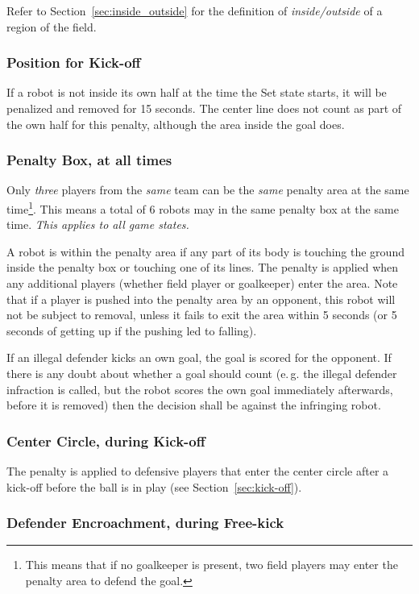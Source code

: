 \documentclass[12pt]{article}
\newcommand{\eg}{\mbox{e.\,g.}\xspace}
\newcommand{\cf}{see\xspace}
\begin{document}
Refer to Section~\ref{sec:inside_outside} for the definition of \textit{inside/outside} of a region of the field.

\subsubsection{Position for Kick-off}
If a robot is not inside its own half at the time the Set state starts, it will be penalized and removed for 15 seconds. The center line does not count as part of the own half for this penalty, although the area inside the goal does.

\subsubsection{Penalty Box, at all times}

Only \textit{three} players from the \textit{same} team can be the \textit{same} penalty area at the same time\footnote{This means that if no goalkeeper is present, two field players may enter the penalty area to defend the goal.}. This means a total of 6 robots may in the same penalty box at the same time.
\emph{This applies to all game states.}

A robot is within the penalty area if any part of its body is touching the ground inside the penalty box or touching one of its lines.  The penalty is applied when any additional players (whether field player or goalkeeper) enter the area. Note that if a player is pushed into the penalty area by an opponent, this robot will not be subject to removal, unless it fails to exit the area within 5 seconds (or 5 seconds of getting up if the pushing led to falling).

If an illegal defender kicks an own goal, the goal is scored for the opponent. If there is any doubt about whether a goal should count (\eg the illegal defender infraction is called, but the robot scores the own goal immediately afterwards, before it is removed) then the decision shall be against the infringing robot.

\subsubsection{Center Circle, during Kick-off}

The penalty is applied to defensive players that enter the center circle after a kick-off before the ball is in play (\cf Section~\ref{sec:kick-off}).

\subsubsection{Defender Encroachment, during Free-kick}
\end{document}

